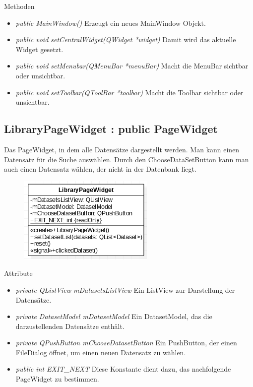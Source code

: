 Methoden
\begin{itemize}
	\item\textit{public MainWindow()} 
	Erzeugt ein neues MainWindow Objekt.
	\item\textit{public void setCentralWidget(QWidget *widget)} 
	Damit wird das aktuelle Widget gesetzt.
	\item\textit{public void setMenubar(QMenuBar *menuBar)} 
	Macht die MenuBar sichtbar oder unsichtbar.
	\item\textit{public void setToolbar(QToolBar *toolbar)} 
	Macht die Toolbar sichtbar oder unsichtbar.
\end{itemize}

\subsection*{LibraryPageWidget : public PageWidget}
Das PageWidget, in dem alle Datensätze dargestellt werden. Man kann einen Datensatz für die Suche auswählen. Durch den ChooseDataSetButton kann man auch einen Datensatz wählen, der nicht in der Datenbank liegt. 

\begin{figure}[H]
	\centering
	\includegraphics[scale=0.5]{img/Klassendiagramm/Klassen/View/LibraryPageWidget}
	\label{fig:libraryPageWidget}
\end{figure}

Attribute
\begin{itemize}
	\item\textit{private QListView mDatasetsListView} 
	Ein ListView zur Darstellung der Datensätze.
	\item\textit{private DatasetModel mDatasetModel}
	Ein DatasetModel, das die darzustellenden Datensätze enthält.
	\item\textit{private QPushButton mChooseDatasetButton} 
	Ein PushButton, der einen FileDialog öffnet, um einen neuen Datensatz zu wählen.
	\item\textit{public int EXIT\_NEXT}
	Diese Konstante dient dazu, das nachfolgende PageWidget zu bestimmen.
\end{itemize}

